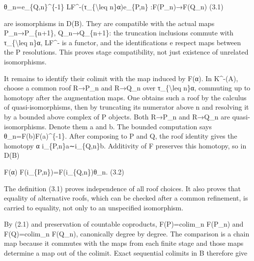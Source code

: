 \documentclass[11pt]{article}
\begin{document}
θ\_\allowbreak{}n\allowbreak{}=e\_\allowbreak{}\{Q,\allowbreak{}n\}\textasciicircum{}\{-1\} LF\textasciicircum{}-(τ\_\allowbreak{}\{\textbackslash{}leq n\}α)\allowbreak{}e\_\allowbreak{}\{P,\allowbreak{}n\} :\allowbreak{}F(P\_\allowbreak{}n)\allowbreak{}\allowbreak{}→F(Q\_\allowbreak{}n)\allowbreak{} (3.1)\allowbreak{}

are isomorphisms in D(B)\allowbreak{}. They are compatible with the actual maps P\_\allowbreak{}n\allowbreak{}→P\_\allowbreak{}\{n\allowbreak{}+1\},\allowbreak{} Q\_\allowbreak{}n\allowbreak{}→Q\_\allowbreak{}\{n\allowbreak{}+1\}:\allowbreak{} the truncation inclusions commute with τ\_\allowbreak{}\{\textbackslash{}leq n\}α,\allowbreak{} LF\^{}- is a functor,\allowbreak{} and the identifications e respect maps between the P resolutions. This proves stage compatibility,\allowbreak{} not just existence of unrelated isomorphisms.

It remains to identify their colimit with the map induced by F(α)\allowbreak{}. In K\textasciicircum{}-(A)\allowbreak{},\allowbreak{} choose a common roof R\allowbreak{}→P\_\allowbreak{}n and R\allowbreak{}→Q\_\allowbreak{}n over τ\_\allowbreak{}\{\textbackslash{}leq n\}α,\allowbreak{} commuting up to homotopy after the augmentation maps. One obtains such a roof by the calculus of quasi-isomorphisms,\allowbreak{} then by truncating its numerator above n and resolving it by a bounded above complex of P objects. Both R\allowbreak{}→P\_\allowbreak{}n and R\allowbreak{}→Q\_\allowbreak{}n are quasi-isomorphisms. Denote them a and b. The bounded computation says θ\_\allowbreak{}n\allowbreak{}=F(b)\allowbreak{}F(a)\allowbreak{}\textasciicircum{}\{-1\}. After composing to P and Q,\allowbreak{} the roof identity gives the homotopy α i\_\allowbreak{}\{P,\allowbreak{}n\}a∼i\_\allowbreak{}\{Q,\allowbreak{}n\}b. Additivity of F preserves this homotopy,\allowbreak{} so in D(B)\allowbreak{}

F(α)\allowbreak{} F(i\_\allowbreak{}\{P,\allowbreak{}n\})\allowbreak{}\allowbreak{}=F(i\_\allowbreak{}\{Q,\allowbreak{}n\})\allowbreak{}θ\_\allowbreak{}n. (3.2)\allowbreak{}

The definition (3.1)\allowbreak{} proves independence of all roof choices. It also proves that equality of alternative roofs,\allowbreak{} which can be checked after a common refinement,\allowbreak{} is carried to equality,\allowbreak{} not only to an unspecified isomorphism.

By (2.1)\allowbreak{} and preservation of countable coproducts,\allowbreak{} F(P)\allowbreak{}\allowbreak{}=colim\_\allowbreak{}n F(P\_\allowbreak{}n)\allowbreak{} and F(Q)\allowbreak{}\allowbreak{}=colim\_\allowbreak{}n F(Q\_\allowbreak{}n)\allowbreak{},\allowbreak{} canonically degree by degree. The comparison is a chain map because it commutes with the maps from each finite stage and those maps determine a map out of the colimit. Exact sequential colimits in B therefore give
\end{document}
